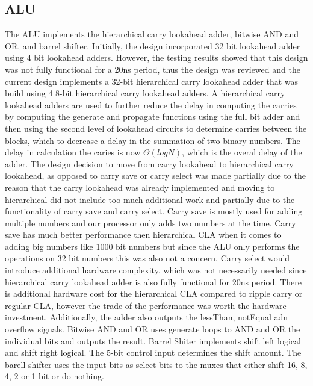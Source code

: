 \documentclass{article}
\begin{document}
\subsection{ALU}
The ALU implements the hierarchical carry lookahead adder, bitwise AND and OR, and barrel shifter.
Initially, the design incorporated 32 bit lookahead adder using 4 bit lookahead adders. However, the testing results showed that this design was not fully functional for a 20ns period, thus the design was reviewed and the current design implements a 32-bit hierarchical carry lookahead adder that was build using 4 8-bit hierarchical carry lookahead adders. A hierarchical carry lookahead adders are used to further reduce the delay  in computing the carries by computing the generate and propagate functions using the full bit adder and then using the second level of lookahead  circuits to determine carries between the blocks, which to decrease a delay in the summation of two binary numbers. The delay in calculation the caries is now $\Theta(logN)$, which is the overal delay of the adder. The design decision to move from carry lookahead to  hierarchical carry lookahead, as opposed to carry save or carry select was made partially due to the reason that the carry lookahead was already implemented and moving to hierarchical did not include too much additional work and partially due to the functionality of carry save and carry select. Carry save is mostly used for adding multiple numbers and our processor only adds two numbers at the time. Carry save has much better performance then hierarchical CLA when it comes to adding big numbers like 1000 bit numbers but since the ALU only performs the operations on 32 bit numbers this was also not a concern. Carry select would introduce additional hardware complexity, which was not necessarily needed since hierarchical carry lookahead adder is also fully functional for 20ns period. 
There is additional hardware cost for the hierarchical CLA compared to ripple carry or regular CLA, however the trade of the performance was worth the hardware investment. 
Additionally, the adder also outputs the lessThan, notEqual adn overflow signals.
Bitwise AND and OR uses generate loops to AND and OR the individual bits and outputs the result.
Barrel Shiter implements shift left logical and shift right logical. The 5-bit control input determines the shift amount. The barell shifter uses the input bits as select bits to the muxes that either shift 16, 8, 4, 2 or 1 bit or do nothing.
\end{document}
